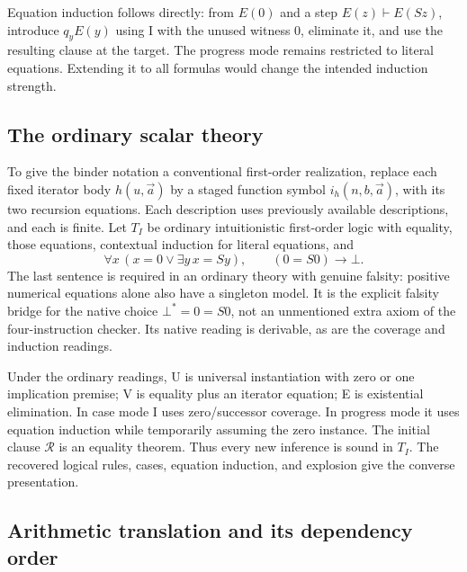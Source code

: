 \documentclass[11pt,letterpaper]{article}
\theoremstyle{definition}\newtheorem{definition}[theorem]{Definition}
\begin{document}
Equation induction follows directly: from $E(0)$ and a step
$E(z)\vdash E(Sz)$, introduce $q_yE(y)$ using I with the unused witness
$0$, eliminate it, and use the resulting clause at the target. The progress
mode remains restricted to literal equations. Extending it to all formulas
would change the intended induction strength.

\subsection{The ordinary scalar theory}

To give the binder notation a conventional first-order realization, replace
each fixed iterator body $h(u,\vec a)$ by a staged function symbol
$i_h(n,b,\vec a)$, with its two recursion equations. Each description
uses previously available descriptions, and each is finite. Let $T_I$ be
ordinary intuitionistic first-order logic with equality, those equations,
contextual induction for literal equations, and
\[
 \forall x\,(x=0\lor\exists y\,x=Sy),\qquad
                         (0=S0)\to\bot.                \tag{Bridge}
\]
The last sentence is required in an ordinary theory with genuine falsity:
positive numerical equations alone also have a singleton model. It is the
explicit falsity bridge for the native choice $\bot^*=0=S0$, not an
unmentioned extra axiom of the four-instruction checker. Its native reading
is derivable, as are the coverage and induction readings.

Under the ordinary readings, U is universal instantiation with zero or one
implication premise; V is equality plus an iterator equation; E is
existential elimination. In case mode I uses zero/successor coverage. In
progress mode it uses equation induction while temporarily assuming the
zero instance. The initial clause $\mathcal R$ is an equality theorem.
Thus every new inference is sound in $T_I$. The recovered logical rules,
cases, equation induction, and explosion give the converse presentation.

\subsection{Arithmetic translation and its dependency order}
\end{document}

